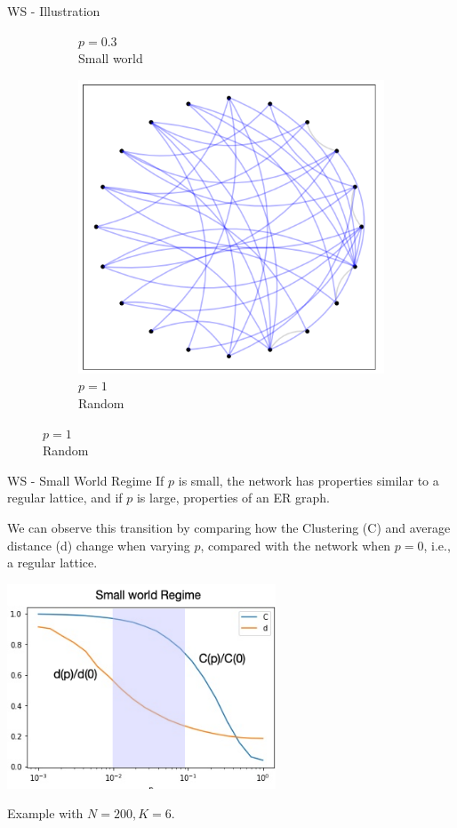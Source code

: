 \documentclass[a4paper,11pt]{book}
\begin{document}
\begin{textbox}{WS - Illustration}
\begin{figure}[H]
\begin{subfigure}{.32\textwidth}
    \caption{$p=0.3$ \\ Small world}
\end{subfigure}
\begin{subfigure}{.32\textwidth}
\includegraphics[width=\textwidth]{pics/SW/WS03.png}
    \caption{$p=1$ \\ Random}
\end{subfigure}

\end{figure}

\end{textbox}






\begin{textbox}{WS - Small World Regime}
If $p$ is small, the network has properties similar to a regular lattice, and if $p$ is large, properties of an ER graph.

We can observe this transition by comparing how the Clustering (C) and average distance (d) change when varying $p$, compared with the network when $p=0$, i.e., a regular lattice. 
\begin{center}
\includegraphics[width=0.6\textwidth]{pics/SW/SWregimes.png}
\end{center}
Example with $N=200, K=6$.
\end{textbox}
\end{document}
